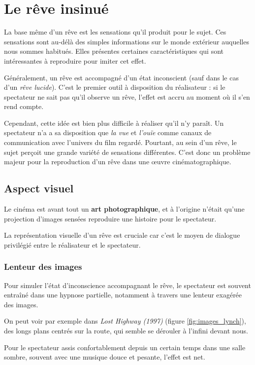 \documentclass[../main.tex]{subfile}
\begin{document}
\section{Le rêve insinué}

La base même d'un rêve est les sensations qu'il produit pour le sujet. Ces
sensations sont au-délà des simples informations sur le monde extérieur
auquelles nous sommes habitués. Elles présentes certaines caractéristiques qui
sont intéressantes à reproduire pour imiter cet effet.

Généralement, un rêve est accompagné d'un état inconscient (sauf dans le cas
d'un \emph{rêve lucide}). C'est le premier outil à disposition du réalisateur :
si le spectateur ne sait pas qu'il observe un rêve, l'effet est accru au moment
où il s'en rend compte.

Cependant, cette idée est bien plus difficile à réaliser qu'il n'y paraît. Un
spectateur n'a a sa disposition que \emph{la vue} et \emph{l'ouïe} comme canaux
de communication avec l'univers du film regardé. Pourtant, au sein d'un rêve,
le sujet perçoit une grande variété de sensations différentes. C'est donc un
problème majeur pour la reproduction d'un rêve dans une \oe{}uvre
cinématographique.

\subsection{Aspect visuel}

Le cinéma est avant tout un \textbf{art photographique}, et à l'origine n'était
qu'une projection d'images sensées reproduire une histoire pour le spectateur.

La représentation visuelle d'un rêve est cruciale car c'est le moyen de
dialogue privilégié entre le réalisateur et le spectateur.

\subsubsection{Lenteur des images}

Pour simuler l'état d'inconscience accompagnant le rêve, le spectateur est
souvent entraîné dans une hypnose partielle, notamment à travers une lenteur
exagérée des images.

On peut voir par exemple dans \emph{Lost Highway (1997)} (figure
\ref{fig:images_lynch}), des longs plans centrés sur la route, qui semble se
dérouler à l'infini devant nous.

Pour le spectateur assis confortablement depuis un certain temps dans une salle
sombre, souvent avec une musique douce et pesante, l'effet est net.
\end{document}
